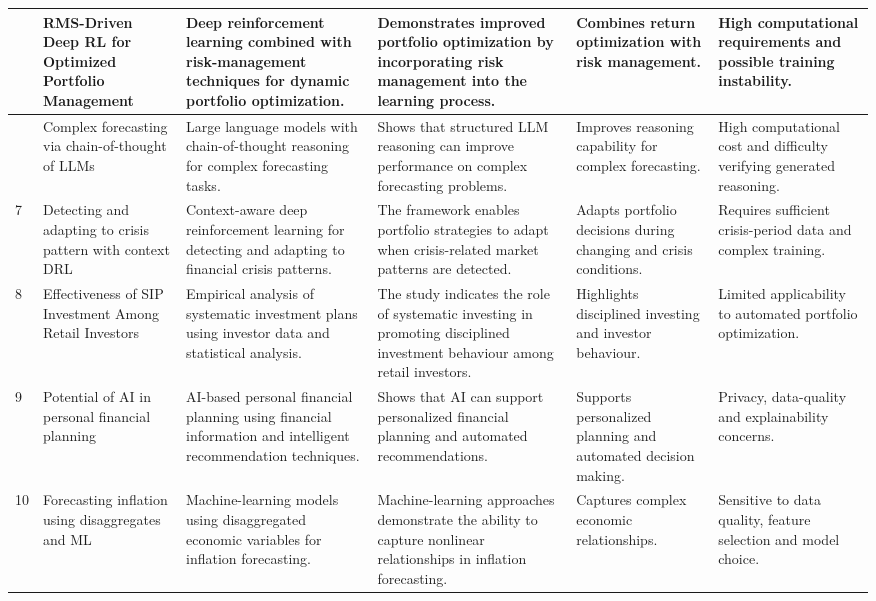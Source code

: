 {{\begin{longtable}{|>{\centering\arraybackslash}p{}|p{}|p{}|p{}|p{}|p{}|}
5 & RMS-Driven Deep RL for Optimized Portfolio Management & Deep reinforcement learning combined with risk-management techniques for dynamic portfolio optimization. & Demonstrates improved portfolio optimization by incorporating risk management into the learning process. & Combines return optimization with risk management. & High computational requirements and possible training instability. \\ \hline

6 & Complex forecasting via chain-of-thought of LLMs & Large language models with chain-of-thought reasoning for complex forecasting tasks. & Shows that structured LLM reasoning can improve performance on complex forecasting problems. & Improves reasoning capability for complex forecasting. & High computational cost and difficulty verifying generated reasoning. \\ \hline

7 & Detecting and adapting to crisis pattern with context DRL & Context-aware deep reinforcement learning for detecting and adapting to financial crisis patterns. & The framework enables portfolio strategies to adapt when crisis-related market patterns are detected. & Adapts portfolio decisions during changing and crisis conditions. & Requires sufficient crisis-period data and complex training. \\ \hline

8 & Effectiveness of SIP Investment Among Retail Investors & Empirical analysis of systematic investment plans using investor data and statistical analysis. & The study indicates the role of systematic investing in promoting disciplined investment behaviour among retail investors. & Highlights disciplined investing and investor behaviour. & Limited applicability to automated portfolio optimization. \\ \hline

9 & Potential of AI in personal financial planning & AI-based personal financial planning using financial information and intelligent recommendation techniques. & Shows that AI can support personalized financial planning and automated recommendations. & Supports personalized planning and automated decision making. & Privacy, data-quality and explainability concerns. \\ \hline

10 & Forecasting inflation using disaggregates and ML & Machine-learning models using disaggregated economic variables for inflation forecasting. & Machine-learning approaches demonstrate the ability to capture nonlinear relationships in inflation forecasting. & Captures complex economic relationships. & Sensitive to data quality, feature selection and model choice. \\ \hline


\end{longtable}}}
